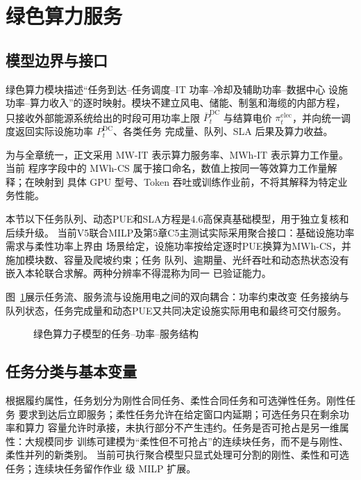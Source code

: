 \section{绿色算力服务}
\label{sec:compute}

\subsection{模型边界与接口}

绿色算力模块描述“任务到达--任务调度--IT 功率--冷却及辅助功率--数据中心
设施功率--算力收入”的逐时映射。模块不建立风电、储能、制氢和海缆的内部方程，
只接收外部能源系统给出的时段可用功率上限 $\overline P_t^{\mathrm{DC}}$ 与结算电价
$\pi_t^{\mathrm{elec}}$，并向统一调度返回实际设施功率 $P_t^{\mathrm{DC}}$、各类任务
完成量、队列、SLA 后果及算力收益。

为与全章统一，正文采用 MW-IT 表示算力服务率、MWh-IT 表示算力工作量。当前
程序字段中的 MWh-CS 属于接口命名，数值上按同一等效算力工作量解释；在映射到
具体 GPU 型号、Token 吞吐或训练作业前，不将其解释为特定业务性能。

本节以下任务队列、动态PUE和SLA方程是4.6高保真基础模型，用于独立复核和后续升级。
当前V5联合MILP及第5章C5主测试实际采用聚合接口：基础设施功率需求与柔性功率上界由
场景给定，设施功率按给定逐时PUE换算为MWh-CS，并施加模块数、容量及爬坡约束；任务
队列、逾期量、光纤吞吐和动态热状态没有嵌入本轮联合求解。两种分辨率不得混称为同一
已验证能力。

图~\ref{fig:compute-model}展示任务流、服务流与设施用电之间的双向耦合：功率约束改变
任务接纳与队列状态，任务完成量和动态PUE又共同决定设施实际用电和最终可交付服务。
\begin{figure}[H]
\centering
\resizebox{0.94\textwidth}{!}{}
\caption{绿色算力子模型的任务--功率--服务结构}
\label{fig:compute-model}
\end{figure}

\subsection{任务分类与基本变量}

根据履约属性，任务划分为刚性合同任务、柔性合同任务和可选弹性任务。刚性任务
要求到达后立即服务；柔性任务允许在给定窗口内延期；可选任务只在剩余功率和算力
容量允许时承接，未执行部分不产生违约。任务是否可抢占是另一维属性：大规模同步
训练可建模为“柔性但不可抢占”的连续块任务，而不是与刚性、柔性并列的新类别。
当前可执行聚合模型只显式处理可分割的刚性、柔性和可选任务；连续块任务留作作业
级 MILP 扩展。

